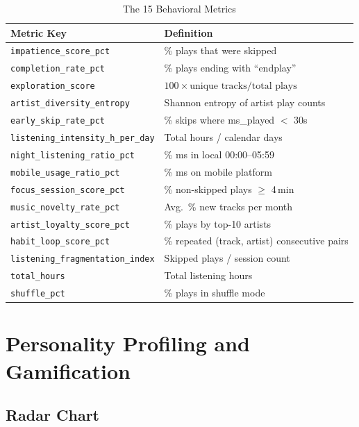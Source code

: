 \documentclass[conference]{IEEEtran}
\begin{document}
\begin{table}[ht]
\caption{The 15 Behavioral Metrics}
\label{tab:metrics}
\centering
\renewcommand{\arraystretch}{1.1}
\begin{tabular}{lp{2.8cm}}
\toprule
\textbf{Metric Key} & \textbf{Definition} \\
\midrule
\texttt{impatience\_score\_pct}          & \% plays that were skipped \\
\texttt{completion\_rate\_pct}           & \% plays ending with ``endplay'' \\
\texttt{exploration\_score}              & $100 \times \text{unique tracks} / \text{total plays}$ \\
\texttt{artist\_diversity\_entropy}      & Shannon entropy of artist play counts \\
\texttt{early\_skip\_rate\_pct}          & \% skips where ms\_played $<$ 30s \\
\texttt{listening\_intensity\_h\_per\_day} & Total hours / calendar days \\
\texttt{night\_listening\_ratio\_pct}    & \% ms in local 00:00–05:59 \\
\texttt{mobile\_usage\_ratio\_pct}       & \% ms on mobile platform \\
\texttt{focus\_session\_score\_pct}      & \% non-skipped plays $\geq$ 4\,min \\
\texttt{music\_novelty\_rate\_pct}       & Avg.\ \% new tracks per month \\
\texttt{artist\_loyalty\_score\_pct}     & \% plays by top-10 artists \\
\texttt{habit\_loop\_score\_pct}         & \% repeated (track, artist) consecutive pairs \\
\texttt{listening\_fragmentation\_index} & Skipped plays / session count \\
\texttt{total\_hours}                    & Total listening hours \\
\texttt{shuffle\_pct}                    & \% plays in shuffle mode \\
\bottomrule
\end{tabular}
\end{table}

\section{Personality Profiling and Gamification}

\subsection{Radar Chart}
\end{document}
